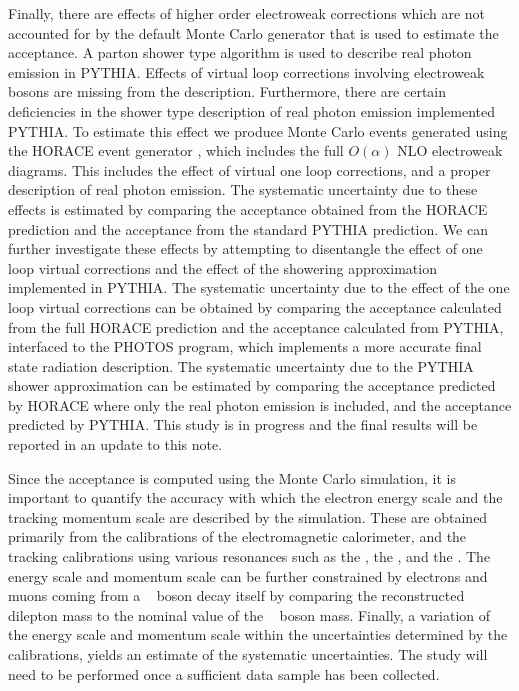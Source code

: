 \documentclass{cmspaper}
\begin{document}
Finally, there are effects of higher order electroweak corrections which are not accounted for by the default Monte Carlo generator that is used to estimate the acceptance. A parton shower type algorithm is used to describe real photon emission in PYTHIA. Effects of virtual loop corrections involving electroweak bosons are missing from the description. Furthermore, there are certain deficiencies in the shower type description of real photon emission implemented PYTHIA. To estimate this effect we produce Monte Carlo events generated using the HORACE event generator \cite{HORACE}, which includes the full $O(\alpha)$ NLO electroweak diagrams. This includes the effect of virtual one loop corrections, and a proper description of real photon emission. The systematic uncertainty due to these effects is estimated by comparing the acceptance obtained from the HORACE prediction and the acceptance from the standard PYTHIA prediction. We can further investigate these effects by attempting to disentangle the effect of one loop virtual corrections and the effect of the showering approximation implemented in PYTHIA. The systematic uncertainty due to the effect of the one loop virtual corrections can be obtained by comparing the acceptance calculated from the full HORACE prediction and the acceptance calculated from PYTHIA, interfaced to the PHOTOS program\cite{PHOTOS}, which implements a more accurate final state radiation description. The systematic uncertainty due to the PYTHIA shower approximation can be estimated by comparing the acceptance predicted by HORACE where only the real photon emission is included, and the acceptance predicted by PYTHIA. This study is in progress and the final results will be reported in an update to this note.



Since the acceptance is computed using the Monte Carlo simulation, it is important to quantify the accuracy with which the electron energy scale and the tracking momentum scale are described by the simulation. These are obtained primarily from the calibrations of the electromagnetic calorimeter, and the tracking calibrations using various resonances such as the \pizero, the \JPSI, and the \UPSI. The energy scale and momentum scale can be further constrained by electrons and muons coming from a \Z~ boson decay itself by comparing the reconstructed dilepton mass to the nominal value of the \Z~ boson mass. Finally, a variation of the energy scale and momentum scale within the uncertainties determined by the calibrations, yields an estimate of the systematic uncertainties. The study will need to be performed once a sufficient data sample has been collected.
\end{document}
